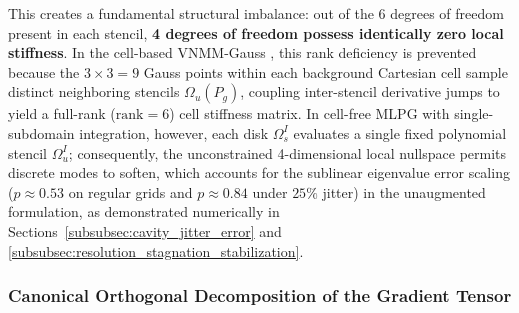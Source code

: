 \documentclass[VANCOUVER,Times1COL]{WileyNJD-v5}
\begin{document}
This creates a fundamental structural imbalance: out of the 6 degrees of freedom present in each stencil, \textbf{4 degrees of freedom possess identically zero local stiffness}. In the cell-based VNMM-Gauss \cite{stable_vnmm2d_2026}, this rank deficiency is prevented because the $3 \times 3 = 9$ Gauss points within each background Cartesian cell sample distinct neighboring stencils $\Omega_u(P_g)$, coupling inter-stencil derivative jumps to yield a full-rank ($\mathrm{rank} = 6$) cell stiffness matrix. In cell-free MLPG with single-subdomain integration, however, each disk $\Omega_s^I$ evaluates a single fixed polynomial stencil $\Omega_u^I$; consequently, the unconstrained 4-dimensional local nullspace permits discrete modes to soften, which accounts for the sublinear eigenvalue error scaling ($p \approx 0.53$ on regular grids and $p \approx 0.84$ under $25\%$ jitter) in the unaugmented formulation, as demonstrated numerically in Sections~\ref{subsubsec:cavity_jitter_error} and \ref{subsubsec:resolution_stagnation_stabilization}.

\subsubsection{Canonical Orthogonal Decomposition of the Gradient Tensor}
\label{subsubsec:canonical_decomposition}
\end{document}
